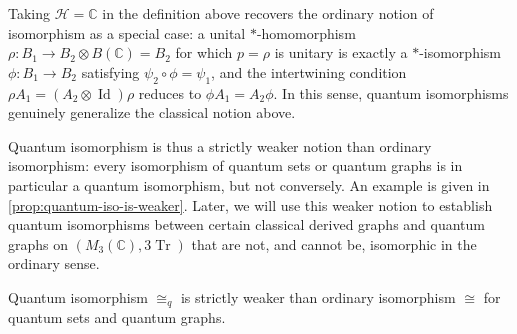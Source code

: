\begin{remark}
    \label{rem:quantum-iso-trivial-hilbert-space}
    Taking \( \mathcal{H} = \mathbb{C} \) in the definition above
    recovers the ordinary notion of isomorphism as a special case: a
    unital \( * \)-homomorphism \( \rho \colon B_1 \to B_2 \otimes
    B(\mathbb{C}) = B_2 \) for which \( p = \rho \) is unitary is
    exactly a \( * \)-isomorphism \( \phi \colon B_1 \to B_2 \)
    satisfying \( \psi_2\circ\phi = \psi_1 \), and the intertwining
    condition \( \rho A_1 = (A_2\otimes\operatorname{Id})\rho \)
    reduces to \( \phi A_1 = A_2\phi \). In this sense, quantum
    isomorphisms genuinely generalize the classical notion above.
\end{remark}

Quantum isomorphism is thus a strictly weaker notion than ordinary
isomorphism: every isomorphism of quantum sets or quantum graphs is in
particular a quantum isomorphism, but not conversely. An example is
given in \ref{prop:quantum-iso-is-weaker}. Later, we will
use this weaker notion to establish quantum isomorphisms between
certain classical derived graphs and quantum graphs on
\( (M_{3}(\mathbb{C}), 3\operatorname{Tr}) \) that are not, and
cannot be, isomorphic
in the ordinary sense.

\begin{proposition}
    \label{prop:quantum-iso-is-weaker}
    Quantum isomorphism \( \cong_q \) is strictly weaker than ordinary
    isomorphism \( \cong \) for quantum sets and quantum graphs.
\end{proposition}

